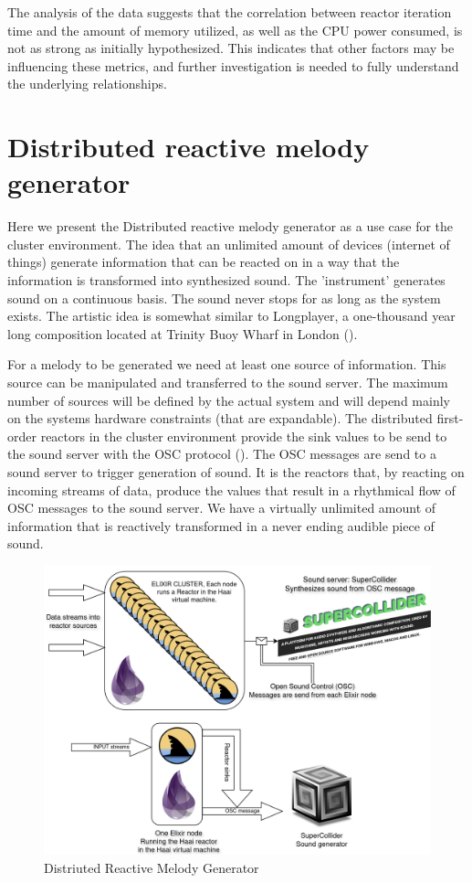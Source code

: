 \documentclass[a4paper]{book}
\begin{document}
The analysis of the data suggests that the correlation between reactor iteration time and the amount of memory utilized, as well as the CPU power consumed, is not as strong as initially hypothesized. This indicates that other factors may be influencing these metrics, and further investigation is needed to fully understand the underlying relationships.

\newpage

\section{Distributed reactive melody generator} \label{sec:drmg}
Here we present the Distributed reactive melody generator as a use case for the cluster environment. The idea that an unlimited amount of devices (internet of things) generate information that can be reacted on in a way that the information is transformed into synthesized sound. The 'instrument' generates sound on a continuous basis. The sound never stops for as long as the system exists. The artistic idea is somewhat similar to Longplayer, a one-thousand year long composition located at Trinity Buoy Wharf in London (\cite{Longplayer2024}). 
	
For a melody to be generated we need at least one source of information. This source can be manipulated and transferred to the sound server. The maximum number of sources will be defined by the actual system and will depend mainly on the systems hardware constraints (that are expandable). The distributed first-order reactors in the cluster environment provide the sink values to be send to the sound server with the OSC protocol (\cite{schmeder2010best}). The OSC messages are send to a sound server to trigger generation of sound. It is the reactors that, by reacting on incoming streams of data, produce the values that result in a rhythmical flow of OSC messages to the sound server. We have a virtually unlimited amount of information that is reactively transformed in a never ending audible piece of sound.

\begin{figure}[h]
	\includegraphics[width=\textwidth]{drmg200.drawio}
	\caption{Distriuted Reactive Melody Generator}
	\label{fig:drmg}
\end{figure}
 
\end{document}
